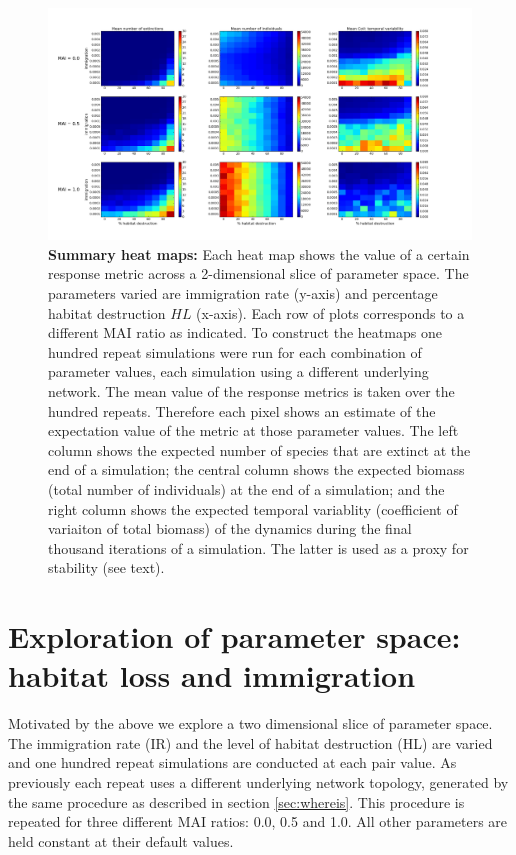 \begin{itemize}
\begin{figure}
        \includegraphics[width=\linewidth]{"./chapters/chapter04/figures/sum_maps"}
        \caption{\textbf{Summary heat maps:} Each heat map shows the value of a certain response metric across a 2-dimensional slice of parameter space. The parameters varied are immigration rate (y-axis) and percentage habitat destruction $HL$ (x-axis). Each row of plots corresponds to a different MAI ratio as indicated. To construct the heatmaps one hundred repeat simulations were run for each combination of parameter values, each simulation using a different underlying network. The mean value of the response metrics is taken over the hundred repeats. Therefore each pixel shows an estimate of the expectation value of the metric at those parameter values. The left column shows the expected number of species that are extinct at the end of a simulation; the central column shows the expected biomass (total number of individuals) at the end of a simulation; and the right column shows the expected temporal variablity (coefficient of variaiton of total biomass) of the dynamics during the final thousand iterations of a simulation. The latter is used as a proxy for stability (see text).}\label{fig:summary_heatmaps_imvshl}
\end{figure}
\clearpage


\section{Exploration of parameter space: habitat loss and immigration}
\label{sec:heatmaps}

Motivated by the above we explore a two dimensional slice of parameter space. The immigration rate (IR) and the level of habitat destruction (HL) are varied and one hundred repeat simulations are conducted at each pair value. As previously each repeat uses a different underlying network topology, generated by the same procedure as described in section \ref{sec:whereis}. This procedure is repeated for three different MAI ratios: 0.0, 0.5 and 1.0. All other parameters are held constant at their default values. 


\end{itemize}
